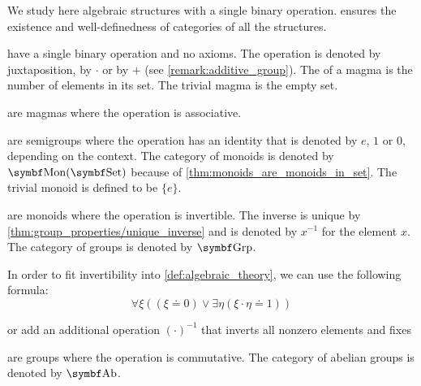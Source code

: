 \begin{definition}\label{def:magma}
  We study here algebraic structures with a single binary operation.  ensures the existence and well-definedness of categories of all the structures.

  \begin{itemize}
      have a single binary operation and no axioms. The operation is denoted by juxtaposition, by \( \cdot \) or by \( + \) (see \cref{remark:additive_group}). The  of a magma is the number of elements in its set. The trivial magma is the empty set.

      are magmas where the operation is associative.

      are semigroups where the operation has an identity that is denoted by \( e \), \( 1 \) or \( 0 \), depending on the context. The category of monoids is denoted by \( \Cat{Mon}(\Cat{Set}) \) because of \cref{thm:monoids_are_monoids_in_set}. The trivial monoid is defined to be \( \{ e \} \).

      are monoids where the operation is invertible. The inverse is unique by \cref{thm:group_properties/unique_inverse} and is denoted by \( x^{-1} \) for the element \( x \). The category of groups is denoted by \( \Cat{Grp} \).

    In order to fit invertibility into \cref{def:algebraic_theory}, we can use the following formula:
    \begin{equation*}
      \forall \xi ((\xi \doteq 0) \lor \exists \eta (\xi \cdot \eta \doteq 1))
    \end{equation*}

    or add an additional operation \( (\cdot)^{-1} \) that inverts all nonzero elements and fixes

      are groups where the operation is commutative. The category of abelian groups is denoted by \( \Cat{Ab} \).
  \end{itemize}


\end{definition}
